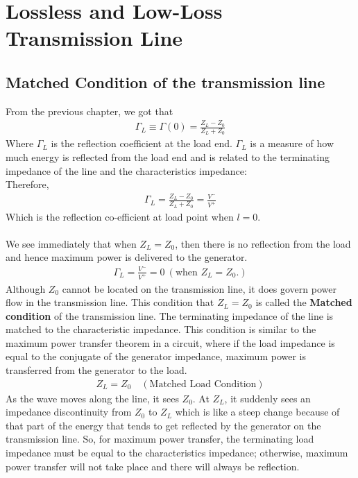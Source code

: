 \chapter{Lossless and Low-Loss Transmission Line}\label{lec:lec4}
\section{Matched Condition of the transmission line}
From the previous chapter, we got that
\begin{align*}
\Gamma_L \equiv \Gamma{(0)} = \frac{Z_L - Z_0}{Z_L + Z_0}
\end{align*}
Where $\Gamma_L$ is the reflection coefficient at the load end. $\Gamma_L$ is a measure of how much energy is reflected from the load end and is related to the terminating impedance of the line and the characteristics impedance:\\

Therefore, 
\begin{align*}
\Gamma_L = \frac{Z_L - Z_0}{Z_L + Z_0} =  \frac{V^-}{V^+}
\end{align*}
Which is the reflection co-efficient at load point when $l = 0$.\\\\
We see immediately that when  $Z_L = Z_0$, then there is no reflection from the load and hence maximum power is delivered to the generator.
\begin{align*}
\Gamma_L = \frac{V^-}{V^+} = 0\ (\text{when }Z_L = Z_0.) 
\end{align*}
Although $Z_0$ cannot be located on the transmission line, it does govern power flow in the transmission line. This condition that $Z_L = Z_0$ is called the \textbf{Matched condition} of the transmission line. The terminating impedance of the line is matched to the characteristic impedance. This condition is similar to the maximum power transfer theorem in a circuit, where if the load impedance is equal to the conjugate of the generator impedance, maximum power is transferred from the generator to the load. 
\begin{align*}
Z_L = Z_0 \quad (\text{Matched Load Condition})
\end{align*}
As the wave moves along the line, it sees $Z_0$. At $Z_L$, it suddenly sees an impedance discontinuity from $Z_0$ to $Z_L$ which is like a steep change because of that part of the energy that tends to get reflected by the generator on the transmission line. So, for maximum power transfer, the terminating load impedance must be equal to the characteristics impedance; otherwise, maximum power transfer will not take place and there will always be reflection.\\


